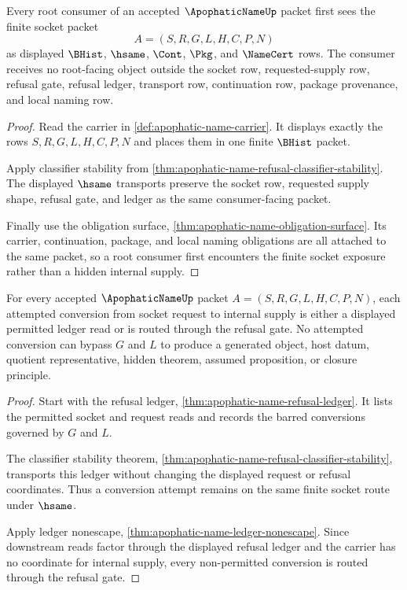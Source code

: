 \begin{theorem}
\label{thm:apophatic-name-root-socket-exposure}
Every root consumer of an accepted $\ApophaticNameUp$ packet first sees the finite socket packet
$$
A=(S,R,G,L,H,C,P,N)
$$
as displayed $\BHist$, $\hsame$, $\Cont$, $\Pkg$, and $\NameCert$ rows. The consumer receives no root-facing object outside the socket row, requested-supply row, refusal gate, refusal ledger, transport row, continuation row, package provenance, and local naming row.
\end{theorem}
\begin{proof}
Read the carrier in \autoref{def:apophatic-name-carrier}. It displays exactly the rows $S,R,G,L,H,C,P,N$ and places them in one finite $\BHist$ packet.

Apply classifier stability from \autoref{thm:apophatic-name-refusal-classifier-stability}. The displayed $\hsame$ transports preserve the socket row, requested supply shape, refusal gate, and ledger as the same consumer-facing packet.

Finally use the obligation surface, \autoref{thm:apophatic-name-obligation-surface}. Its carrier, continuation, package, and local naming obligations are all attached to the same packet, so a root consumer first encounters the finite socket exposure rather than a hidden internal supply.
\end{proof}

\begin{theorem}
\label{thm:apophatic-name-root-refusal-gate-totality}
For every accepted $\ApophaticNameUp$ packet $A=(S,R,G,L,H,C,P,N)$, each attempted conversion from socket request to internal supply is either a displayed permitted ledger read or is routed through the refusal gate. No attempted conversion can bypass $G$ and $L$ to produce a generated object, host datum, quotient representative, hidden theorem, assumed proposition, or closure principle.
\end{theorem}
\begin{proof}
Start with the refusal ledger, \autoref{thm:apophatic-name-refusal-ledger}. It lists the permitted socket and request reads and records the barred conversions governed by $G$ and $L$.

The classifier stability theorem, \autoref{thm:apophatic-name-refusal-classifier-stability}, transports this ledger without changing the displayed request or refusal coordinates. Thus a conversion attempt remains on the same finite socket route under $\hsame$.

Apply ledger nonescape, \autoref{thm:apophatic-name-ledger-nonescape}. Since downstream reads factor through the displayed refusal ledger and the carrier has no coordinate for internal supply, every non-permitted conversion is routed through the refusal gate.
\end{proof}

